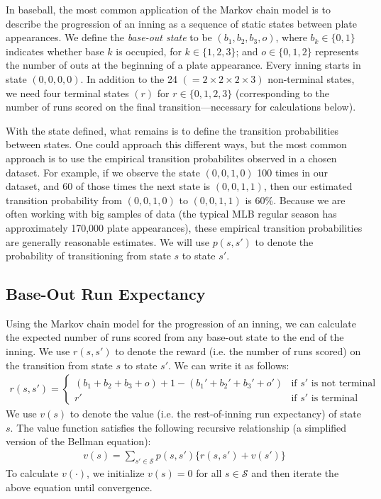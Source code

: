 \documentclass{article}
\begin{document}
      In baseball, the most common application of the Markov chain model is to describe the progression of an inning as a sequence of static states between plate appearances. We define the {\it base-out state} to be $(b_1, b_2, b_3, o)$, where $b_k \in \{0, 1\}$ indicates whether base $k$ is occupied, for $k \in \{1, 2, 3\}$; and $o \in \{0, 1, 2\}$ represents the number of outs at the beginning of a plate appearance. Every inning starts in state $(0, 0, 0, 0)$. In addition to the 24 $(= 2 \times 2 \times 2 \times 3)$ non-terminal states, we need four terminal states $(r)$ for $r \in \{0, 1, 2, 3\}$ (corresponding to the number of runs scored on the final transition---necessary for calculations below).

      With the state defined, what remains is to define the transition probabilities between states. One could approach this different ways, but the most common approach is to use the empirical transition probabilites observed in a chosen dataset. For example, if we observe the state $(0, 0, 1, 0)$ 100 times in our dataset, and 60 of those times the next state is $(0, 0, 1, 1)$, then our estimated transition probability from $(0, 0, 1, 0)$ to $(0, 0, 1, 1)$ is 60\%. Because we are often working with big samples of data (the typical MLB regular season has approximately 170,000 plate appearances), these empirical transition probabilities are generally reasonable estimates. We will use $p(s, s')$ to denote the probability of transitioning from state $s$ to state $s'$.

    \subsection{\sc Base-Out Run Expectancy}

      Using the Markov chain model for the progression of an inning, we can calculate the expected number of runs scored from any base-out state to the end of the inning. We use $r(s, s')$ to denote the reward (i.e. the number of runs scored) on the transition from state $s$ to state $s'$. We can write it as follows:
      \begin{align*}
        r(s, s') = \begin{cases}
          (b_1 + b_2 + b_3 + o) + 1 - (b_1' + b_2' + b_3' + o') & \mbox{if $s'$ is not terminal}\\
          r' & \mbox{if $s'$ is terminal}
        \end{cases}
      \end{align*}
      We use $v(s)$ to denote the value (i.e. the rest-of-inning run expectancy) of state $s$. The value function satisfies the following recursive relationship (a simplified version of the Bellman equation):
      \begin{align*}
        v(s) = \sum_{s' \in \mathcal{S}} p(s, s') \{r(s, s') + v(s')\}
      \end{align*}
      To calculate $v(\cdot)$, we initialize $v(s) = 0$ for all $s \in \mathcal{S}$ and then iterate the above equation until convergence.
\end{document}
